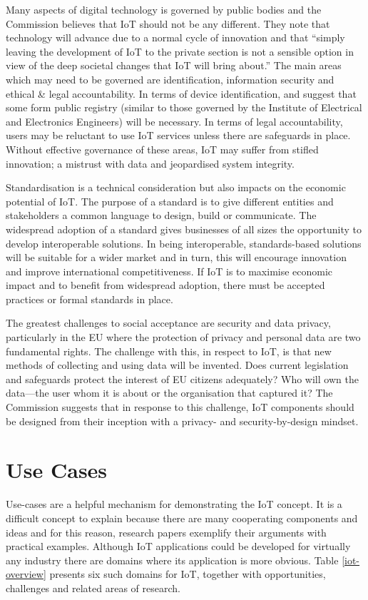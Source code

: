     Many aspects of digital technology is governed by public bodies and the Commission believes that IoT should not be any different. They note that technology will advance due to a normal cycle of innovation and that ``simply leaving the development of IoT to the private section is not a sensible option in view of the deep societal changes that IoT will bring about.'' The main areas which may need to be governed are identification, information security and ethical \& legal accountability. In terms of device identification, \citet{fromIoC} and \citep{ECIoT:2009} suggest that some form public registry (similar to those governed by the Institute of Electrical and Electronics Engineers) will be necessary. In terms of legal accountability, users may be reluctant to use IoT services unless there are safeguards in place. Without effective governance of these areas, IoT may suffer from stifled innovation; a mistrust with data and jeopardised system integrity.

    Standardisation is a technical consideration but also impacts on the economic potential of IoT. The purpose of a standard is to give different entities and stakeholders a common language to design, build or communicate. The widespread adoption of a standard gives businesses of all sizes the opportunity to develop interoperable solutions. In being interoperable, standards-based solutions will be suitable for a wider market and in turn, this will encourage innovation and improve international competitiveness. If IoT is to maximise economic impact and to benefit from widespread adoption, there must be accepted practices or formal standards in place.

    The greatest challenges to social acceptance are security and data privacy, particularly in the EU where the protection of privacy and personal data are two fundamental rights. The challenge with this, in respect to IoT, is that new methods of collecting and using data will be invented. Does current legislation and safeguards protect the interest of EU citizens adequately? Who will own the data---the user whom it is about or the organisation that captured it? The Commission suggests that in response to this challenge, IoT components should be designed from their inception with a privacy- and security-by-design mindset.

  \section{Use Cases}
  \label{use-cases}
    Use-cases are a helpful mechanism for demonstrating the IoT concept. It is a difficult concept to explain because there are many cooperating components and ideas and for this reason, research papers exemplify their arguments with practical examples. Although IoT applications could be developed for virtually any industry there are domains where its application is more obvious. Table \ref{iot-overview} presents six such domains for IoT, together with opportunities, challenges and related areas of research.

